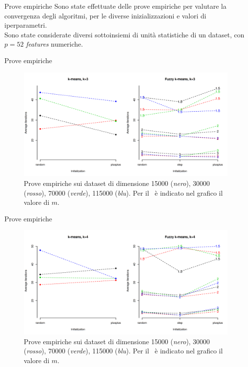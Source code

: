 \documentclass{beamer}
\begin{document}
\begin{frame}{Prove empiriche}
    Sono state effettuate delle prove empiriche per valutare la convergenza degli algoritmi, per le diverse inizializzazioni e valori di iperparametri.\\[.5cm]
    \pause
    Sono state considerate diversi sottoinsiemi di unità statistiche di un dataset, con $p = 52$ \textit{features} numeriche.
\end{frame}

\begin{frame}{Prove empiriche}
        \begin{figure}[H]
        \centering
        \includegraphics[width=0.99\textwidth]{figures/clust-3.png}
        \caption{Prove empiriche sui dataset di dimensione 15000 (\textit{nero}), 30000 (\textit{rosso}), 70000 (\textit{verde}), 115000 (\textit{blu}). Per il \fcm\ è indicato nel grafico il valore di $m$.}
        \label{fig:k3}
    \end{figure}
\end{frame}

\begin{frame}{Prove empiriche}
    \begin{figure}[H]
        \centering
        \includegraphics[width=0.99\textwidth]{figures/clust-4.png}
        \caption{Prove empiriche sui dataset di dimensione 15000 (\textit{nero}), 30000 (\textit{rosso}), 70000 (\textit{verde}), 115000 (\textit{blu}). Per il \fcm\ è indicato nel grafico il valore di $m$.}
        \label{fig:k4}
    \end{figure}
\end{frame}
\end{document}
